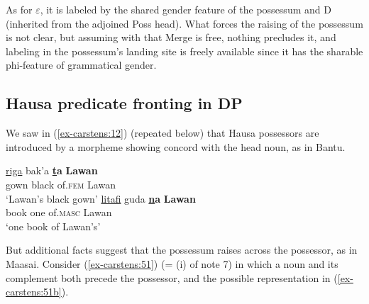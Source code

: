 \documentclass[output=paper
,modfonts
,nonflat]{langsci/langscibook}
\begin{document}
As for $\varepsilon$, it is labeled by the shared gender feature of the possessum and D (inherited from the adjoined Poss head). What forces the raising of the possessum is not clear, but assuming with \citet{Chomsky2015} that Merge is free, nothing precludes it, and labeling in the possessum’s landing site is freely available since it has the sharable phi-feature of grammatical gender. 

\subsection{Hausa predicate fronting in DP} \label{sec-carstens:6.3}
We saw in (\ref{ex-carstens:12}) (repeated below) that Hausa possessors are introduced by a morpheme showing concord with the head noun, as in Bantu. 

\begin{exe}
	 \citep[301]{Newman2000}
	\xlist
	\ex 
	\gll \uline{riga}   bak’a   \textbf{\uline{t}a}       \textbf{Lawan} \\
	gown   black   of.\textsc{fem}    Lawan\\
	\glt `Lawan’s black gown'  	
	\ex 
	\gll \uline{litafi}     guda \textbf{\uline{n}a}       \textbf{Lawan}\\
	book one  of.\textsc{masc}  Lawan\\
	\glt `one book of Lawan's'
	\endxlist
\end{exe}
But additional facts suggest that the possessum raises across the possessor, as in Maasai.  Consider (\ref{ex-carstens:51}) (= (i) of note 7) in which a noun and its complement both precede the possessor, and the possible representation in (\ref{ex-carstens:51b}). 
\end{document}
